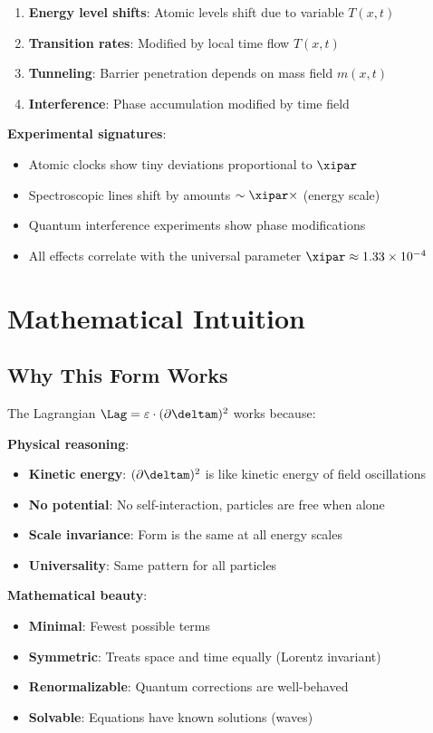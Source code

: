 	\begin{enumerate}
		\item \textbf{Energy level shifts}: Atomic levels shift due to variable $T(x,t)$
		\item \textbf{Transition rates}: Modified by local time flow $T(x,t)$
		\item \textbf{Tunneling}: Barrier penetration depends on mass field $m(x,t)$
		\item \textbf{Interference}: Phase accumulation modified by time field
	\end{enumerate}
	
	\textbf{Experimental signatures}:
	\begin{itemize}
		\item Atomic clocks show tiny deviations proportional to $\xipar$
		\item Spectroscopic lines shift by amounts $\sim \xipar \times$ (energy scale)
		\item Quantum interference experiments show phase modifications
		\item All effects correlate with the universal parameter $\xipar \approx 1.33 \times 10^{-4}$
	\end{itemize}

	\section{Mathematical Intuition}
	
	\subsection{Why This Form Works}
	
	The Lagrangian $\Lag = \varepsilon \cdot (\partial \deltam)^2$ works because:
	
	\textbf{Physical reasoning}:
	\begin{itemize}
		\item \textbf{Kinetic energy}: $(\partial \deltam)^2$ is like kinetic energy of field oscillations
		\item \textbf{No potential}: No self-interaction, particles are free when alone
		\item \textbf{Scale invariance}: Form is the same at all energy scales
		\item \textbf{Universality}: Same pattern for all particles
	\end{itemize}
	
	\textbf{Mathematical beauty}:
	\begin{itemize}
		\item \textbf{Minimal}: Fewest possible terms
		\item \textbf{Symmetric}: Treats space and time equally (Lorentz invariant)
		\item \textbf{Renormalizable}: Quantum corrections are well-behaved
		\item \textbf{Solvable}: Equations have known solutions (waves)
	\end{itemize}
	
